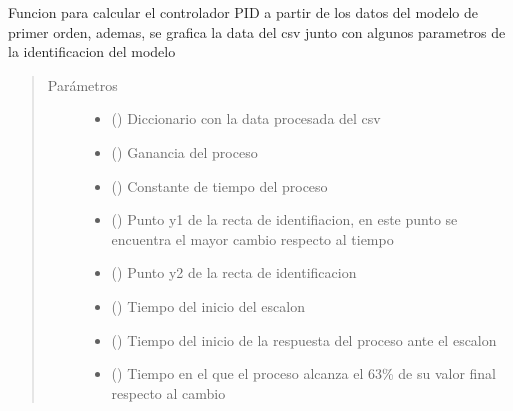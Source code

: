 \documentclass[letterpaper,10pt,spanish]{sphinxmanual}
\begin{document}

\begin{fulllineitems}
\label{\detokenize{codigos/rutinas_CSV:rutinas_CSV.entonar_y_graficar}}
Funcion para calcular el controlador PID a partir de los datos del modelo de primer orden, ademas, se grafica la data del csv junto con algunos parametros de la identificacion del modelo
\begin{quote}\begin{description}
\item[{Parámetros}] \leavevmode\begin{itemize}
\item {} 
 () \textendash{} Diccionario con la data procesada del csv

\item {} 
 () \textendash{} Ganancia del proceso

\item {} 
 () \textendash{} Constante de tiempo del proceso

\item {} 
 () \textendash{} Punto y1 de la recta de identifiacion, en este punto se encuentra el mayor cambio respecto al tiempo

\item {} 
 () \textendash{} Punto y2 de la recta de identificacion

\item {} 
 () \textendash{} Tiempo del inicio del escalon

\item {} 
 () \textendash{} Tiempo del inicio de la respuesta del proceso ante el escalon

\item {} 
 () \textendash{} Tiempo en el que el proceso alcanza el 63\% de su valor final respecto al cambio

\end{itemize}

\end{description}\end{quote}

\end{fulllineitems}
\end{document}

